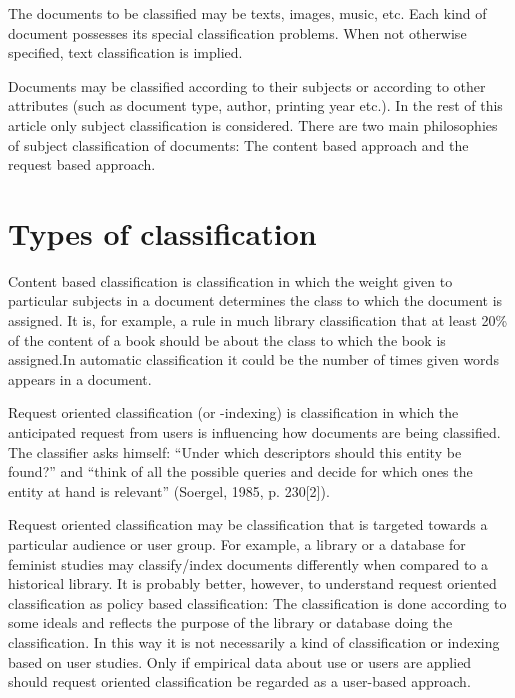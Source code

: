\documentclass[12pt]{book}
\begin{document}
The documents to be classified may be texts, images, music, etc. Each kind of document possesses its special classification problems. When not otherwise specified, text classification is implied.

Documents may be classified according to their subjects or according to other attributes (such as document type, author, printing year etc.). In the rest of this article only subject classification is considered. There are two main philosophies of subject classification of documents: The content based approach and the request based approach. \cite{wikipedia-textclassification}

\section{Types of classification}
Content based classification is classification in which the weight given to particular subjects in a document determines the class to which the document is assigned. It is, for example, a rule in much library classification that at least 20\% of the content of a book should be about the class to which the book is assigned.In automatic classification it could be the number of times given words appears in a document.

Request oriented classification (or -indexing) is classification in which the anticipated request from users is influencing how documents are being classified. The classifier asks himself: “Under which descriptors should this entity be found?” and “think of all the possible queries and decide for which ones the entity at hand is relevant” (Soergel, 1985, p. 230[2]).

Request oriented classification may be classification that is targeted towards a particular audience or user group. For example, a library or a database for feminist studies may classify/index documents differently when compared to a historical library. It is probably better, however, to understand request oriented classification as policy based classification: The classification is done according to some ideals and reflects the purpose of the library or database doing the classification. In this way it is not necessarily a kind of classification or indexing based on user studies. Only if empirical data about use or users are applied should request oriented classification be regarded as a user-based approach.
\end{document}
